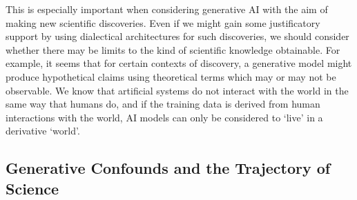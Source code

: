 \documentclass[11pt, oneside]{article}   	%
\begin{document}



 


  



This is especially important when considering generative AI with the aim of making new scientific discoveries.  Even if we might gain some justificatory support by using dialectical architectures for such discoveries, we should consider whether there may be limits to the kind of scientific knowledge obtainable.  For example, it seems that for certain contexts of discovery, a generative model might produce hypothetical claims using theoretical terms which may or may not be observable.  We know that artificial systems do not interact with the world in the same way that humans do, and if the training data is derived from human interactions with the world, AI models can only be considered to `live' in a derivative `world'.









\subsection{Generative Confounds and the Trajectory of Science}

\end{document}
